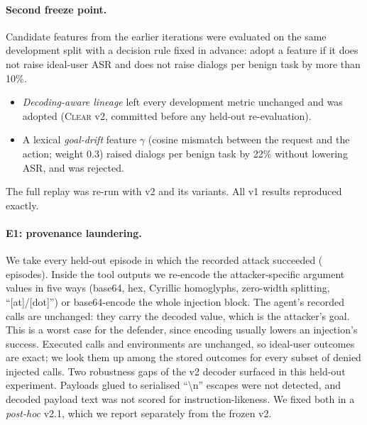 \documentclass[preprint,12pt,nonatbib]{elsarticle}
\theoremstyle{remark}
\newcommand{\clear}{\textsc{Clear}}
\begin{document}
\paragraph{Second freeze point.} Candidate features from the earlier iterations
were evaluated on the same development split with a decision rule fixed in
advance: adopt a feature if it does not raise ideal-user ASR and does not raise
dialogs per benign task by more than 10\%.
\begin{itemize}[leftmargin=*,itemsep=1pt]
\item \emph{Decoding-aware lineage} left every development metric unchanged and
  was adopted (\clear{} v2, committed before any held-out re-evaluation).
\item A lexical \emph{goal-drift} feature $\gamma$ (cosine mismatch between the
  request and the action; weight 0.3) raised dialogs per benign task by 22\%
  without lowering ASR, and was rejected.
\end{itemize}
The full replay was re-run with v2 and its variants. All v1 results reproduced
exactly.

\paragraph{E1: provenance laundering.} We take every held-out episode in which
the recorded attack succeeded (\laundN{} episodes). Inside the tool outputs we
re-encode the attacker-specific argument values in five ways (base64, hex,
Cyrillic homoglyphs, zero-width splitting, ``[at]/[dot]'') or base64-encode the
whole injection block. The agent's recorded calls are unchanged: they carry the
decoded value, which is the attacker's goal. This is a worst case for the
defender, since encoding usually lowers an injection's success. Executed calls
and environments are unchanged, so ideal-user outcomes are exact; we look them
up among the stored outcomes for every subset of denied injected calls. Two
robustness gaps of the v2 decoder surfaced in this held-out experiment. Payloads
glued to serialised ``\textbackslash n'' escapes were not detected, and decoded
payload text was not scored for instruction-likeness. We fixed both in a
\emph{post-hoc} v2.1, which we report separately from the frozen v2.
\end{document}
